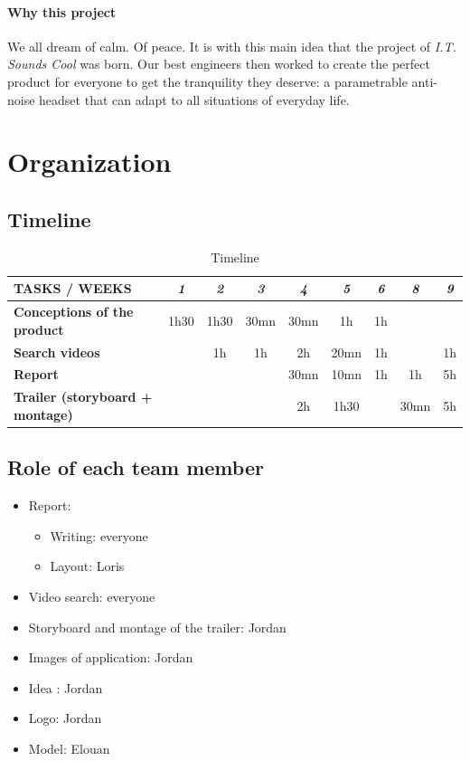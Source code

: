 \documentclass[12pt, a4paper]{article}
\begin{document}
\paragraph{Why this project}
We all dream of calm. Of peace. It is with this main idea that the project of \emph{I.T. Sounds Cool} was born. Our best engineers then worked to create the perfect product for everyone to get the tranquility they deserve: a parametrable anti-noise headset that can adapt to all situations of everyday life.

\section{Organization}

\subsection{Timeline}

\begin{table}[!h]
\centering
\caption{Timeline}
\label{my-label}
\begin{tabular}{|l|c|c|c|c|c|c|c|c|}
\hline
\textbf{TASKS / WEEKS} & \textit{\textbf{1}} & \textit{\textbf{2}} & \textit{\textbf{3}} & \textit{\textbf{4}} & \textit{\textbf{5}} & \textit{\textbf{6}} & \textit{\textbf{8}} & \textit{\textbf{9}} \\ \hline
\textbf{Conceptions of the product} & 1h30 & 1h30 & 30mn & 30mn & 1h & 1h &  &  \\ \hline
\textbf{Search videos} &  & 1h & 1h & 2h & 20mn & 1h &  & 1h \\ \hline
\textbf{Report} &  &  &  & 30mn & 10mn & 1h & 1h & 5h \\ \hline
\textbf{Trailer (storyboard + montage)} &  &  &  & 2h & 1h30 &  & 30mn & 5h \\ \hline
\end{tabular}
\end{table}

\subsection{Role of each team member}

\begin{itemize}

    \item Report: 
        \begin{itemize}
        \item Writing: everyone
        \item Layout: Loris
        \end{itemize}
    \item Video search: everyone
    \item Storyboard and montage of the trailer: Jordan
    \item Images of application: Jordan
    \item Idea : Jordan
    \item Logo: Jordan
    \item Model: Elouan

\end{itemize}
\end{document}
